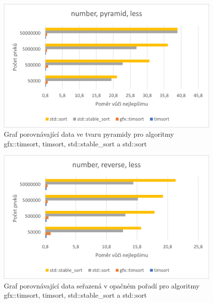 \documentclass[thesis=B,czech]{FITthesis}[2019/12/23]
\begin{document}
\begin{figure}[htbp]\centering
	\includegraphics{obrazky/graf7.png}
	\caption[Graf porovnávající data ve tvaru pyramidy pro algoritmy\linebreak gfx::timsort, timsort, std::stable\_sort a std::sort]{Graf porovnávající data ve tvaru pyramidy pro algoritmy gfx::timsort, timsort, std::stable\_sort a std::sort}\label{fig:graf7}
\end{figure}

\begin{figure}[htbp]\centering
	\includegraphics{obrazky/graf8.png}
	\caption[Graf porovnávající data seřazená v opačném pořadí pro algoritmy gfx::timsort, timsort, std::stable\_sort a std::sort]{Graf porovnávající data seřazená v opačném pořadí pro algoritmy gfx::timsort, timsort, std::stable\_sort a std::sort}\label{fig:graf8}
\end{figure}
\end{document}
